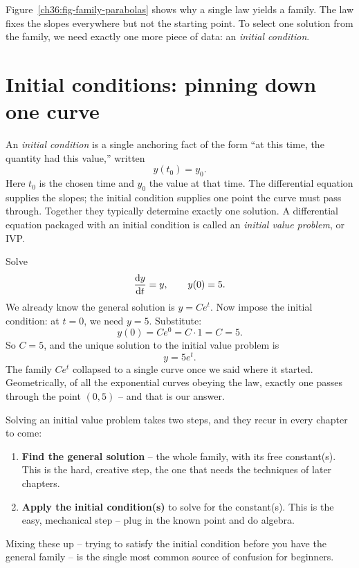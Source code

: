 Figure~\ref{ch36:fig-family-parabolas} shows why a single law yields a family. The law fixes the slopes everywhere but not the starting point. To select one solution from the family, we need exactly one more piece of data: an \emph{initial condition}.

\section{Initial conditions: pinning down one curve}
\label{ch36:sec-ic}

An \emph{initial condition} is a single anchoring fact of the form ``at this time, the quantity had this value,'' written
\[
  y(t_0) = y_0.
\]
Here $t_0$ is the chosen time and $y_0$ the value at that time. The differential equation supplies the slopes; the initial condition supplies one point the curve must pass through. Together they typically determine exactly one solution. A differential equation packaged with an initial condition is called an \emph{initial value problem}, or IVP.

\begin{example}
\label{ch36:ex-ivp}
Solve
\[
  \frac{\mathrm{d} y}{\mathrm{d} t} = y, \qquad y(0) = 5.
\]
We already know the general solution is $y = Ce^t$. Now impose the initial condition: at $t=0$, we need $y = 5$. Substitute:
\[
  y(0) = Ce^{0} = C\cdot 1 = C = 5.
\]
So $C = 5$, and the unique solution to the initial value problem is
\[
  y = 5e^t.
\]
The family $Ce^t$ collapsed to a single curve once we said where it started. Geometrically, of all the exponential curves obeying the law, exactly one passes through the point $(0,5)$ -- and that is our answer.
\end{example}

\begin{focusbox}
Solving an initial value problem takes two steps, and they recur in every chapter to come:
\begin{enumerate}
  \item \textbf{Find the general solution} -- the whole family, with its free constant(s). This is the hard, creative step, the one that needs the techniques of later chapters.
  \item \textbf{Apply the initial condition(s)} to solve for the constant(s). This is the easy, mechanical step -- plug in the known point and do algebra.
\end{enumerate}
Mixing these up -- trying to satisfy the initial condition before you have the general family -- is the single most common source of confusion for beginners.
\end{focusbox}

